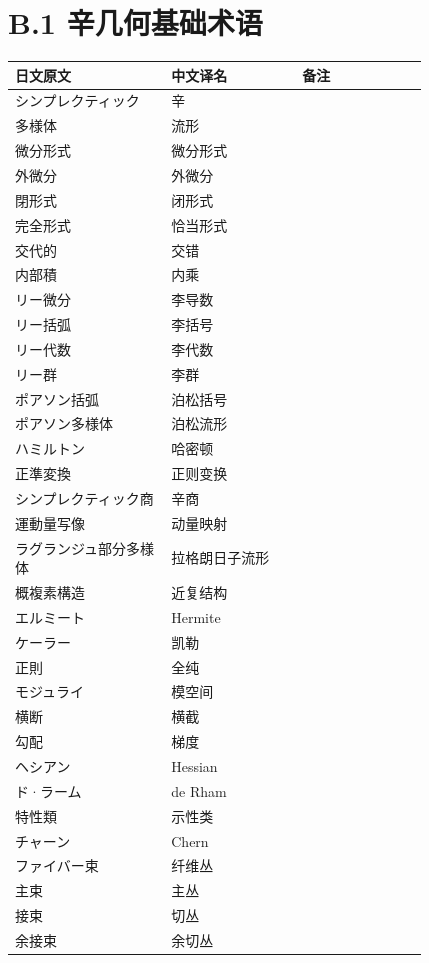 \section*{B.1 辛几何基础术语}
{\small
\begin{longtable}{p{0.31\linewidth} p{0.26\linewidth} p{0.25\linewidth}}
\toprule
日文原文 & 中文译名 & 备注 \\
\midrule
\endhead
シンプレクティック & 辛 &  \\
多様体 & 流形 &  \\
微分形式 & 微分形式 &  \\
外微分 & 外微分 &  \\
閉形式 & 闭形式 &  \\
完全形式 & 恰当形式 &  \\
交代的 & 交错 &  \\
内部積 & 内乘 &  \\
リー微分 & 李导数 &  \\
リー括弧 & 李括号 &  \\
リー代数 & 李代数 &  \\
リー群 & 李群 &  \\
ポアソン括弧 & 泊松括号 &  \\
ポアソン多様体 & 泊松流形 &  \\
ハミルトン & 哈密顿 &  \\
正準変換 & 正则变换 &  \\
シンプレクティック商 & 辛商 &  \\
運動量写像 & 动量映射 &  \\
ラグランジュ部分多様体 & 拉格朗日子流形 &  \\
概複素構造 & 近复结构 &  \\
エルミート & Hermite &  \\
ケーラー & 凯勒 &  \\
正則 & 全纯 &  \\
モジュライ & 模空间 &  \\
横断 & 横截 &  \\
勾配 & 梯度 &  \\
ヘシアン & Hessian &  \\
ド·ラーム & de Rham &  \\
特性類 & 示性类 &  \\
チャーン & Chern &  \\
ファイバー束 & 纤维丛 &  \\
主束 & 主丛 &  \\
接束 & 切丛 &  \\
余接束 & 余切丛 &  \\

\end{longtable}}
